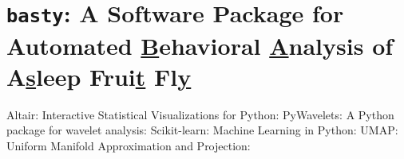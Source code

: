 \setlength{\parindent}{0pt}
\chapter{
  \texorpdfstring{
	  \texttt{basty}: A Software Package for Automated \underline{B}ehavioral \underline{A}nalysis of A\underline{s}leep Frui\underline{t} Fl\underline{y}
  }{
	  basty: A Software Package for Automated Behavioral Analysis of Asleep Fruit Fly
  }
 }

Altair: {Interactive} {Statistical} {Visualizations} for {Python}: \citep{vanderplas_altair_2018}
{PyWavelets}: {A} {Python} package for wavelet analysis: \citep{lee_pywavelets_2019}
Scikit-learn: {Machine} {Learning} in {Python}: \citep{pedregosa_scikit-learn_2011}
{UMAP}: {Uniform} {Manifold} {Approximation} and {Projection}: \citep{mcinnes_umap_2018}
